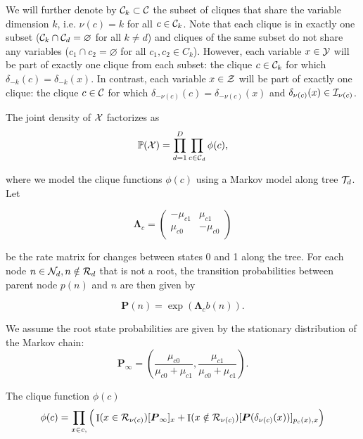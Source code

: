 \documentclass[
11pt, %
oneside, %
english, %
singlespacing, %
headsepline, %
chapterinoneline, %
]{MastersDoctoralThesis} %
\DeclareMathOperator{\Ind}{I}
\def\P{\mathbb{P}}
\def\bLambda{\boldsymbol{\Lambda}}
\def\bP{\boldsymbol{P}}
\def\Ccal{{\cal C}}
\def\I{{\cal I}}
\def\N{{\cal N}}
\def\R{{\cal R}}
\def\T{{\cal T}}
\def\X{{\cal X}}
\def\Y{{\cal Y}}
\def\Z{{\cal Z}}
\begin{document}
We will further denote by $\Ccal_k \subset \Ccal$ the subset of cliques that share the variable dimension $k$, i.e. $\nu(c)=k$ for all $c \in \Ccal_k$. Note that each clique is in exactly one subset ($\Ccal_k \cap \Ccal_d = \varnothing$ for all $k \neq d$) and cliques of the same subset do not share any variables ($c_1 \cap c_2 = \varnothing$ for all $c_1, c_2 \in C_k$). However, each variable $x \in \Y$ will be part of exactly one clique from each subset: the clique $c \in \Ccal_k$ for which $\delta_{-k}(c) = \delta_{-k}(x)$. In contrast, each variable $x \in \Z$ will be part of exactly one clique: the clique $c \in \Ccal$ for which $\delta_{-\nu(c)}(c) = \delta_{-\nu(c)}(x)$ and $\delta_{\nu(c)}(x) \in \I_{\nu(c)}$.

The joint density of $\X$ factorizes as
\begin{equation}
	\P(\X) = \prod_{d=1}^D \prod_{c \in \Ccal_d} \phi(c),
\end{equation}

where
we model the clique functions $\phi(c)$ using a Markov model along tree $\T_d$. Let

\begin{equation}
	\bLambda_c =
	\begin{pmatrix}
		-\mu_{c1} & \mu_{c1}\\
		\mu_{c0} & -\mu_{c0}\\
	\end{pmatrix}
\end{equation}

be the rate matrix for changes between states 0 and 1 along the tree. For each node $n \in \N_d, n \notin \R_d$ that is not a root, the transition probabilities between parent node $p(n)$ and $n$ are then given by

\begin{equation}
	\bP(n) = \exp(\bLambda_c b(n)).
\end{equation}

We assume the root state probabilities are given by the stationary distribution of the Markov chain:
\begin{equation}
	\bP_{\infty} = \left(\frac{\mu_{c0}}{\mu_{c0} + \mu_{c1}}, \frac{\mu_{c1}}{\mu_{c0} + \mu_{c1}}\right).
\end{equation}


The clique function $\phi(c)$
\begin{equation}
	\phi(c) = \prod_{x \in c, }\Big( \Ind(x \in \R_{\nu(c)})[\bP_{\infty}]_x + \Ind(x \notin \R_{\nu(c)}) [\bP(\delta_{\nu(c)}(x))]_{p_{c}(x), x} \Big)
\end{equation}
\end{document}
